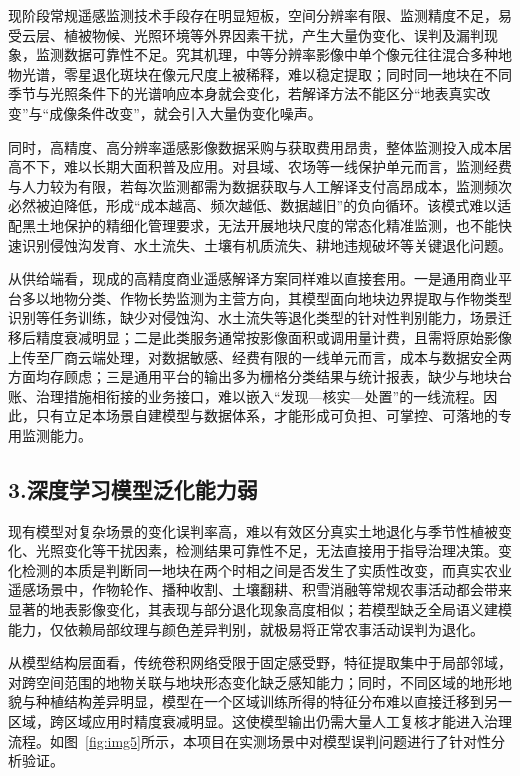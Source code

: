 \documentclass[12pt, a4paper]{ctexart}
\begin{document}
现阶段常规遥感监测技术手段存在明显短板，空间分辨率有限、监测精度不足，易受云层、植被物候、光照环境等外界因素干扰，产生大量伪变化、误判及漏判现象，监测数据可靠性不足。究其机理，中等分辨率影像中单个像元往往混合多种地物光谱，零星退化斑块在像元尺度上被稀释，难以稳定提取；同时同一地块在不同季节与光照条件下的光谱响应本身就会变化，若解译方法不能区分“地表真实改变”与“成像条件改变”，就会引入大量伪变化噪声。

同时，高精度、高分辨率遥感影像数据采购与获取费用昂贵，整体监测投入成本居高不下，难以长期大面积普及应用。对县域、农场等一线保护单元而言，监测经费与人力较为有限，若每次监测都需为数据获取与人工解译支付高昂成本，监测频次必然被迫降低，形成“成本越高、频次越低、数据越旧”的负向循环。该模式难以适配黑土地保护的精细化管理要求，无法开展地块尺度的常态化精准监测，也不能快速识别侵蚀沟发育、水土流失、土壤有机质流失、耕地违规破坏等关键退化问题。

从供给端看，现成的高精度商业遥感解译方案同样难以直接套用。一是通用商业平台多以地物分类、作物长势监测为主营方向，其模型面向地块边界提取与作物类型识别等任务训练，缺少对侵蚀沟、水土流失等退化类型的针对性判别能力，场景迁移后精度衰减明显；二是此类服务通常按影像面积或调用量计费，且需将原始影像上传至厂商云端处理，对数据敏感、经费有限的一线单元而言，成本与数据安全两方面均存顾虑；三是通用平台的输出多为栅格分类结果与统计报表，缺少与地块台账、治理措施相衔接的业务接口，难以嵌入“发现—核实—处置”的一线流程。因此，只有立足本场景自建模型与数据体系，才能形成可负担、可掌控、可落地的专用监测能力。

\subsection{3.深度学习模型泛化能力弱}

现有模型对复杂场景的变化误判率高，难以有效区分真实土地退化与季节性植被变化、光照变化等干扰因素，检测结果可靠性不足，无法直接用于指导治理决策。变化检测的本质是判断同一地块在两个时相之间是否发生了实质性改变，而真实农业遥感场景中，作物轮作、播种收割、土壤翻耕、积雪消融等常规农事活动都会带来显著的地表影像变化，其表现与部分退化现象高度相似；若模型缺乏全局语义建模能力，仅依赖局部纹理与颜色差异判别，就极易将正常农事活动误判为退化。

从模型结构层面看，传统卷积网络\cite{ref5,ref7}受限于固定感受野，特征提取集中于局部邻域，对跨空间范围的地物关联与地块形态变化缺乏感知能力；同时，不同区域的地形地貌与种植结构差异明显，模型在一个区域训练所得的特征分布难以直接迁移到另一区域，跨区域应用时精度衰减明显。这使模型输出仍需大量人工复核才能进入治理流程。如图~\ref{fig:img5}所示，本项目在实测场景中对模型误判问题进行了针对性分析验证。
\end{document}

